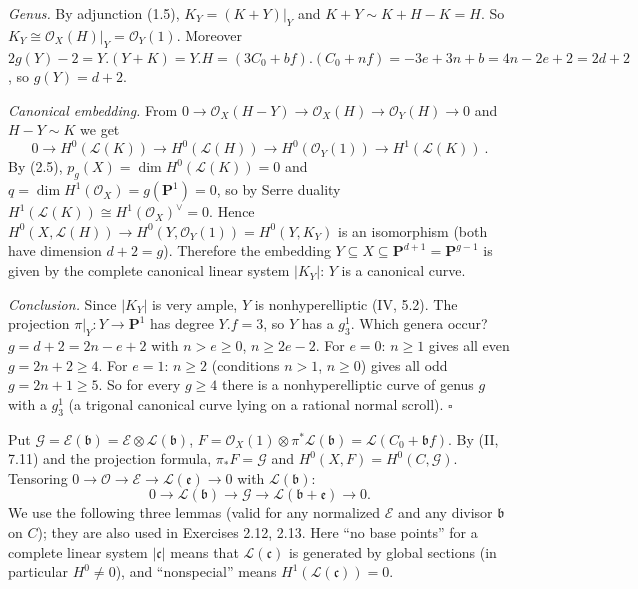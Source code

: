 \documentclass[11pt]{article}
\begin{document}
\emph{Genus.} By adjunction (1.5), $K_Y=(K+Y)|_Y$ and $K+Y\sim K+H-K=H$. So $K_Y\cong\mathcal O_X(H)|_Y=\mathcal O_Y(1)$. Moreover $2g(Y)-2=Y.(Y+K)=Y.H=(3C_0+bf).(C_0+nf)=-3e+3n+b=4n-2e+2=2d+2$, so $g(Y)=d+2$.

\emph{Canonical embedding.} From $0\to\mathcal O_X(H-Y)\to\mathcal O_X(H)\to\mathcal O_Y(H)\to0$ and $H-Y\sim K$ we get
\[ 0\to H^0(\mathcal L(K))\to H^0(\mathcal L(H))\to H^0(\mathcal O_Y(1))\to H^1(\mathcal L(K))\ . \]
By (2.5), $p_g(X)=\dim H^0(\mathcal L(K))=0$ and $q=\dim H^1(\mathcal O_X)=g(\mathbf P^1)=0$, so by Serre duality $H^1(\mathcal L(K))\cong H^1(\mathcal O_X)^\vee=0$. Hence $H^0(X,\mathcal L(H))\to H^0(Y,\mathcal O_Y(1))=H^0(Y,K_Y)$ is an isomorphism (both have dimension $d+2=g$). Therefore the embedding $Y\subseteq X\subseteq\mathbf P^{d+1}=\mathbf P^{g-1}$ is given by the complete canonical linear system $|K_Y|$: $Y$ is a canonical curve.

\emph{Conclusion.} Since $|K_Y|$ is very ample, $Y$ is nonhyperelliptic (IV, 5.2). The projection $\pi|_Y\colon Y\to\mathbf P^1$ has degree $Y.f=3$, so $Y$ has a $g^1_3$. Which genera occur? $g=d+2=2n-e+2$ with $n>e\ge0$, $n\ge2e-2$. For $e=0$: $n\ge1$ gives all even $g=2n+2\ge4$. For $e=1$: $n\ge2$ (conditions $n>1$, $n\ge0$) gives all odd $g=2n+1\ge5$. So for every $g\ge4$ there is a nonhyperelliptic curve of genus $g$ with a $g^1_3$ (a trigonal canonical curve lying on a rational normal scroll). \hfill$\square$

\pf
Put $\mathcal G=\mathcal E(\mathfrak b)=\mathcal E\otimes\mathcal L(\mathfrak b)$, $F=\mathcal O_X(1)\otimes\pi^*\mathcal L(\mathfrak b)=\mathcal L(C_0+\mathfrak bf)$. By (II, 7.11) and the projection formula, $\pi_*F=\mathcal G$ and $H^0(X,F)=H^0(C,\mathcal G)$. Tensoring $0\to\mathcal O\to\mathcal E\to\mathcal L(\mathfrak e)\to0$ with $\mathcal L(\mathfrak b)$:
\[ 0\to\mathcal L(\mathfrak b)\to\mathcal G\to\mathcal L(\mathfrak b+\mathfrak e)\to0.\tag{1} \]
We use the following three lemmas (valid for any normalized $\mathcal E$ and any divisor $\mathfrak b$ on $C$); they are also used in Exercises 2.12, 2.13. Here ``no base points'' for a complete linear system $|\mathfrak c|$ means that $\mathcal L(\mathfrak c)$ is generated by global sections (in particular $H^0\ne0$), and ``nonspecial'' means $H^1(\mathcal L(\mathfrak c))=0$.
\end{document}
